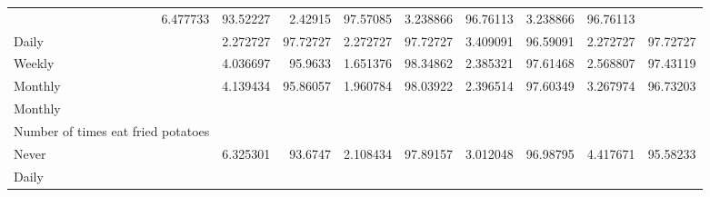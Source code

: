 \documentclass{article}
\begin{document}
\begin{tabular}{lllllllll}
  \multicolumn{1}{|r}{6.477733} &
  \multicolumn{1}{r}{93.52227} &
  \multicolumn{1}{r}{2.42915} &
  \multicolumn{1}{r}{97.57085} &
  \multicolumn{1}{r}{3.238866} &
  \multicolumn{1}{r}{96.76113} &
  \multicolumn{1}{r}{3.238866} &
  \multicolumn{1}{r}{96.76113} \\
\multicolumn{1}{l}{\hspace{5em}Daily} &
  \multicolumn{1}{|r}{2.272727} &
  \multicolumn{1}{r}{97.72727} &
  \multicolumn{1}{r}{2.272727} &
  \multicolumn{1}{r}{97.72727} &
  \multicolumn{1}{r}{3.409091} &
  \multicolumn{1}{r}{96.59091} &
  \multicolumn{1}{r}{2.272727} &
  \multicolumn{1}{r}{97.72727} \\
\multicolumn{1}{l}{\hspace{5em}Weekly} &
  \multicolumn{1}{|r}{4.036697} &
  \multicolumn{1}{r}{95.9633} &
  \multicolumn{1}{r}{1.651376} &
  \multicolumn{1}{r}{98.34862} &
  \multicolumn{1}{r}{2.385321} &
  \multicolumn{1}{r}{97.61468} &
  \multicolumn{1}{r}{2.568807} &
  \multicolumn{1}{r}{97.43119} \\
\multicolumn{1}{l}{\hspace{5em}Monthly} &
  \multicolumn{1}{|r}{4.139434} &
  \multicolumn{1}{r}{95.86057} &
  \multicolumn{1}{r}{1.960784} &
  \multicolumn{1}{r}{98.03922} &
  \multicolumn{1}{r}{2.396514} &
  \multicolumn{1}{r}{97.60349} &
  \multicolumn{1}{r}{3.267974} &
  \multicolumn{1}{r}{96.73203} \\
\multicolumn{1}{l}{\hspace{3em}Monthly} &
  \multicolumn{1}{|r}{} &
  \multicolumn{1}{r}{} &
  \multicolumn{1}{r}{} &
  \multicolumn{1}{r}{} &
  \multicolumn{1}{r}{} &
  \multicolumn{1}{r}{} &
  \multicolumn{1}{r}{} &
  \multicolumn{1}{r}{} \\
\multicolumn{1}{l}{\hspace{4em}Number of times eat fried potatoes} &
  \multicolumn{1}{|r}{} &
  \multicolumn{1}{r}{} &
  \multicolumn{1}{r}{} &
  \multicolumn{1}{r}{} &
  \multicolumn{1}{r}{} &
  \multicolumn{1}{r}{} &
  \multicolumn{1}{r}{} &
  \multicolumn{1}{r}{} \\
\multicolumn{1}{l}{\hspace{5em}Never} &
  \multicolumn{1}{|r}{6.325301} &
  \multicolumn{1}{r}{93.6747} &
  \multicolumn{1}{r}{2.108434} &
  \multicolumn{1}{r}{97.89157} &
  \multicolumn{1}{r}{3.012048} &
  \multicolumn{1}{r}{96.98795} &
  \multicolumn{1}{r}{4.417671} &
  \multicolumn{1}{r}{95.58233} \\
\multicolumn{1}{l}{\hspace{5em}Daily} &

\end{tabular}
\end{document}
